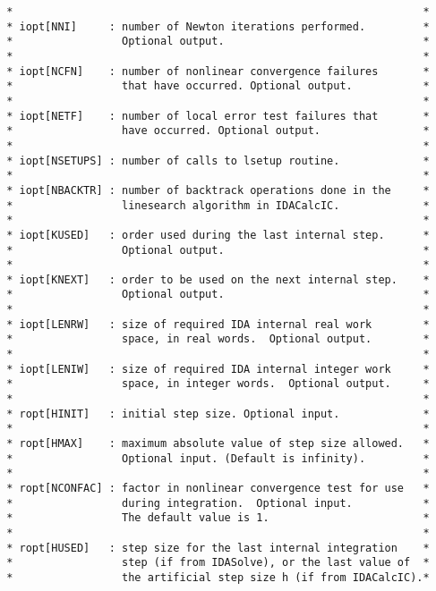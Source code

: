 \documentclass[11pt]{article}
\begin{document}
\begin{verbatim}
 *                                                                *
 * iopt[NNI]     : number of Newton iterations performed.         *
 *                 Optional output.                               *
 *                                                                *
 * iopt[NCFN]    : number of nonlinear convergence failures       *
 *                 that have occurred. Optional output.           *
 *                                                                *
 * iopt[NETF]    : number of local error test failures that       *
 *                 have occurred. Optional output.                *
 *                                                                *
 * iopt[NSETUPS] : number of calls to lsetup routine.             *
 *                                                                *
 * iopt[NBACKTR] : number of backtrack operations done in the     *
 *                 linesearch algorithm in IDACalcIC.             *
 *                                                                *
 * iopt[KUSED]   : order used during the last internal step.      *
 *                 Optional output.                               *
 *                                                                *
 * iopt[KNEXT]   : order to be used on the next internal step.    *
 *                 Optional output.                               *
 *                                                                *
 * iopt[LENRW]   : size of required IDA internal real work        *
 *                 space, in real words.  Optional output.        *
 *                                                                *
 * iopt[LENIW]   : size of required IDA internal integer work     *
 *                 space, in integer words.  Optional output.     *
 *                                                                *
 * ropt[HINIT]   : initial step size. Optional input.             *
 *                                                                *
 * ropt[HMAX]    : maximum absolute value of step size allowed.   *
 *                 Optional input. (Default is infinity).         *
 *                                                                *
 * ropt[NCONFAC] : factor in nonlinear convergence test for use   *
 *                 during integration.  Optional input.           *
 *                 The default value is 1.                        *
 *                                                                *
 * ropt[HUSED]   : step size for the last internal integration    *
 *                 step (if from IDASolve), or the last value of  *
 *                 the artificial step size h (if from IDACalcIC).*

\end{verbatim}
\end{document}
